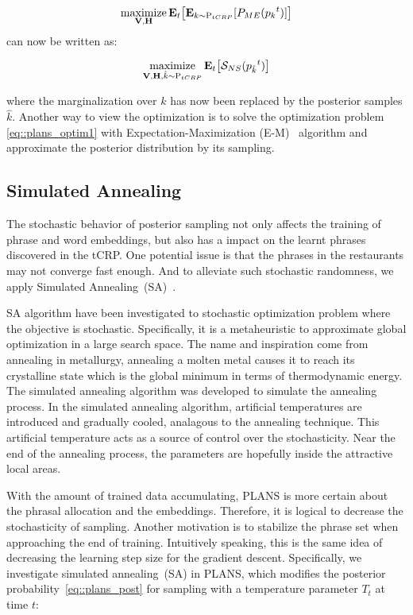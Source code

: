 \begin{equation}
  \operatorname*{maximize}\limits_{\mathbf{V,H}} \mathbf{E}_{t}\big[
    \mathbf{E}_{k \sim \mathrm{P}_{tCRP}}[ P_{ME}({p_k}^t) ]
  \big]
  \label{eq::plans_optim1}
\end{equation}
%
can now be written as:

\begin{equation}
  \operatorname*{maximize}\limits_{\mathbf{V,H}, \hat{k} \sim \mathrm{P}_{tCRP} }
  \mathbf{E}_{t}\big[ \mathcal{S}_{NS}( {p_{\hat{k}}}^t ) \big]
  \label{eq::plans_optim2}
\end{equation}

where the marginalization over $k$ has now been replaced by the posterior
samples $\hat{k}$. Another way to view the optimization is to solve the
optimization problem \eqref{eq::plans_optim1} with Expectation-Maximization
(E-M)~\cite{dempster1977maximum} algorithm and approximate the posterior
distribution by its sampling.

\subsection{Simulated Annealing}

The stochastic behavior of posterior sampling not only affects the training of
phrase and word embeddings, but also has a impact on the learnt phrases
discovered in the tCRP. One potential issue is that the phrases in the
restaurants may not converge fast enough. And to alleviate such stochastic
randomness, we apply Simulated Annealing~(SA)~\cite{brooks1995optimization}.

SA algorithm have been investigated to stochastic optimization problem where the
objective is stochastic. Specifically, it is a metaheuristic to approximate
global optimization in a large search space. The name and inspiration come from
annealing in metallurgy, annealing a molten metal causes it to reach its
crystalline state which is the global minimum in terms of thermodynamic energy.
The simulated annealing algorithm was developed to simulate the annealing
process. In the simulated annealing algorithm, artificial temperatures are
introduced and gradually cooled, analagous to the annealing technique. This
artificial temperature acts as a source of control over the stochasticity. Near
the end of the annealing process, the parameters are hopefully inside the
attractive local areas.

With the amount of trained data accumulating, PLANS is more certain about the
phrasal allocation and the embeddings. Therefore, it is logical to decrease the
stochasticity of sampling. Another motivation is to stabilize the phrase set
when approaching the end of training. Intuitively speaking, this is the same
idea of decreasing the learning step size for the gradient descent.
Specifically, we investigate simulated annealing~(SA) in PLANS, which modifies
the posterior probability~\eqref{eq::plans_post} for sampling with a temperature
parameter $T_t$ at time $t$:

